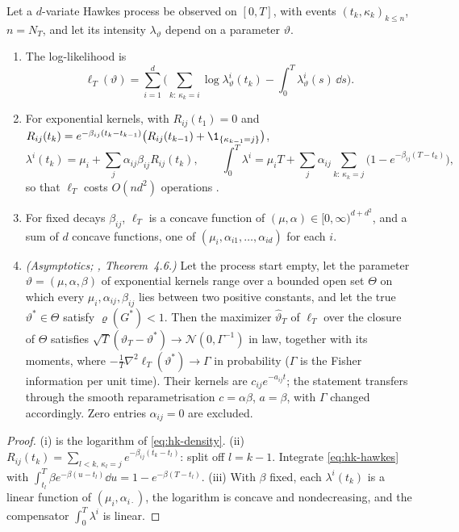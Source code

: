 \begin{proposition}\label{prop:hk-mle}
Let a $d$-variate Hawkes process be observed on $[0,T]$, with events $(t_k,\kappa_k)_{k\le n}$, $n=N_T$, and let
its intensity $\lambda_\vartheta$ depend on a parameter $\vartheta$.
\begin{enumerate}[label=(\roman*)]
  \item The log-likelihood is
    \begin{equation}\label{eq:hk-loglik}
      \ell_T(\vartheta)=\sum_{i=1}^d\Big(\sum_{k:\,\kappa_k=i}\log\lambda^i_\vartheta(t_k)-\int_0^T\lambda^i_\vartheta(s)\,\dd s\Big).
    \end{equation}
  \item For exponential kernels, with $R_{ij}(t_1)=0$ and
    $R_{ij}(t_k)=e^{-\beta_{ij}(t_k-t_{k-1})}\big(R_{ij}(t_{k-1})+\1_{\{\kappa_{k-1}=j\}}\big)$,
    \[
      \lambda^i(t_k)=\mu_i+\sum_j\alpha_{ij}\beta_{ij}R_{ij}(t_k),\qquad
      \int_0^T\lambda^i=\mu_iT+\sum_j\alpha_{ij}\sum_{k:\,\kappa_k=j}\big(1-e^{-\beta_{ij}(T-t_k)}\big),
    \]
    so that $\ell_T$ costs $O(nd^2)$ operations \citep{ozaki-1979}.
  \item For fixed decays $\beta_{ij}$, $\ell_T$ is a concave function of $(\mu,\alpha)\in[0,\infty)^{d+d^2}$, and
    a sum of $d$ concave functions, one of $(\mu_i,\alpha_{i1},\dots,\alpha_{id})$ for each $i$.
  \item \emph{(Asymptotics; \textcite{clinet-yoshida-2017}, Theorem~4.6.)} Let the process start empty, let the
    parameter $\vartheta=(\mu,\alpha,\beta)$ of exponential kernels range over a bounded open set $\Theta$ on which
    every $\mu_i,\alpha_{ij},\beta_{ij}$ lies between two positive constants, and let the true $\vartheta^*\in\Theta$ satisfy
    $\varrho(G^*)<1$. Then the maximizer $\hat\vartheta_T$ of $\ell_T$ over the closure of $\Theta$ satisfies
    $\sqrt T(\hat\vartheta_T-\vartheta^*)\to\mathcal N(0,\Gamma^{-1})$ in law, together with its moments, where
    $-\frac1T\nabla^2\ell_T(\vartheta^*)\to\Gamma$ in probability ($\Gamma$ is the Fisher information per unit time).
    Their kernels are $c_{ij}e^{-a_{ij}t}$; the statement transfers through the smooth reparametrisation
    $c=\alpha\beta$, $a=\beta$, with $\Gamma$ changed accordingly. Zero entries $\alpha_{ij}=0$ are excluded.
\end{enumerate}
\end{proposition}

\begin{proof}
(i) is the logarithm of \eqref{eq:hk-density}. (ii) $R_{ij}(t_k)=\sum_{l<k,\,\kappa_l=j}e^{-\beta_{ij}(t_k-t_l)}$:
split off $l=k-1$. Integrate \eqref{eq:hk-hawkes} with $\int_{t_l}^T\beta e^{-\beta(u-t_l)}\dd u=1-e^{-\beta(T-t_l)}$.
(iii) With $\beta$ fixed, each $\lambda^i(t_k)$ is a linear function of $(\mu_i,\alpha_{i\cdot})$, the logarithm is
concave and nondecreasing, and the compensator $\int_0^T\lambda^i$ is linear.
\end{proof}

